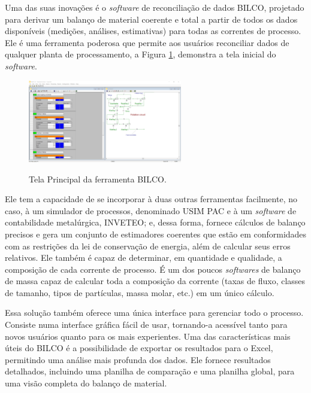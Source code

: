 Uma das suas inovações é o \textit{software} de reconciliação de dados BILCO, projetado para derivar um balanço de material coerente e total a partir de todos os dados disponíveis (medições, análises, estimativas) para todas as correntes de processo. Ele é uma ferramenta poderosa que permite aos usuários reconciliar dados de qualquer planta de processamento, a Figura \ref{fig:BILCO}, demonstra a tela inicial do \textit{software}.

\begin{figure}[htbp!] 
    \begin{center}
        \includegraphics[width=0.6\textwidth]{figuras/BILCOCASPEOP.png}
        \caption{Tela Principal da ferramenta BILCO.}
        \vspace{6mm}
        \label{fig:BILCO}
    \end{center} 
\end{figure}

Ele tem a capacidade de se incorporar à duas outras ferramentas facilmente, no caso, à um simulador de processos, denominado USIM PAC e à um \textit{software} de contabilidade metalúrgica, INVETEO; e, dessa forma, fornece cálculos de balanço precisos e gera um conjunto de estimadores coerentes que estão em conformidades com as restrições da lei de conservação de energia, além de calcular seus erros relativos. Ele também é capaz de determinar, em quantidade e qualidade, a composição de cada corrente de processo. É um dos poucos \textit{softwares} de balanço de massa capaz de calcular toda a composição da corrente (taxas de fluxo, classes de tamanho, tipos de partículas, massa molar, etc.) em um único cálculo.

Essa solução também oferece uma única interface para gerenciar todo o processo. Consiste numa interface gráfica fácil de usar, tornando-a acessível tanto para novos usuários quanto para os mais experientes. Uma das características mais úteis do BILCO é a possibilidade de exportar os resultados para o Excel, permitindo uma análise mais profunda dos dados. Ele fornece resultados detalhados, incluindo uma planilha de comparação e uma planilha global, para uma visão completa do balanço de material.

